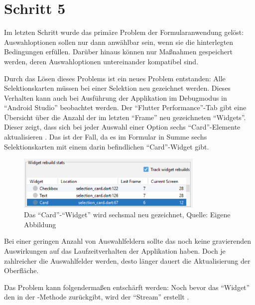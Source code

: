 \chapter{Schritt 5}
\label{chap:Schritt-5}

Im letzten Schritt wurde das primäre Problem der Formularanwendung gelöst:
Auswahloptionen sollen nur dann anwählbar sein,
wenn sie die hinterlegten Bedingungen erfüllen.
Darüber hinaus können nur Maßnahmen gespeichert werden,
deren Auswahloptionen untereinander kompatibel sind.

Durch das Lösen dieses Problems ist ein neues Problem entstanden:
Alle Selektionskarten müssen bei einer Selektion neu gezeichnet werden.
Dieses Verhalten kann auch bei Ausführung der Applikation im Debugmodus in \enquote{Android Studio} beobachtet werden.
Der \enquote{Flutter Performance}-Tab gibt eine Übersicht über die Anzahl der im letzten \enquote{Frame} neu gezeichneten \enquote{Widgets}. 
Dieser zeigt, dass sich bei jeder Auswahl einer Option sechs \enquote{Card}-Elemente aktualisieren \Abb{\ref{fig:Schritt5_6rebuilds}}.
Das ist der Fall, da es im Formular in Summe sechs Selektionskarten mit einem darin befindlichen \enquote{Card}-Widget gibt.

\begin{figure}[ht]
  \centering
  \ifIncludeFigures
  \includegraphics[width=0.8\textwidth]{Inhalt/Hauptteil/Implementierung/Schritt-5/6rebuilds.png}
  \fi
  \caption[Das \enquote{Card}-\enquote{Widget} wird sechsmal neu gezeichnet]{Das \enquote{Card}-\enquote{Widget} wird sechsmal neu gezeichnet, Quelle: Eigene Abbildung}
  
  \label{fig:Schritt5_6rebuilds}
\end{figure}%


Bei einer geringen Anzahl von Auswahlfeldern sollte das noch keine gravierenden Auswirkungen auf das Laufzeitverhalten der Applikation haben.
Doch je zahlreicher die Auswahlfelder werden,
desto länger dauert die Aktualisierung der Oberfläche.

Das Problem kann folgendermaßen entschärft werden:
Noch bevor das \enquote{Widget}  den  in der -Methode zurückgibt,
wird der \enquote{Stream}  erstellt .

